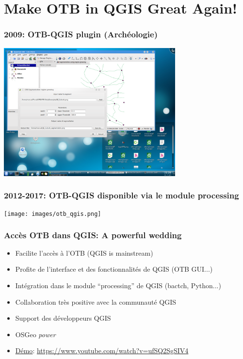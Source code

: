 \section{Make OTB in QGIS Great Again!}

\begin{frame}
\frametitle{2009: OTB-QGIS plugin (Archéologie)}
\begin{minipage}[t][6cm][t]{\textwidth}
\begin{center}
\includegraphics[width=0.7\textwidth]{images/otb-qgis-2009.png}
\end{center}
\end{minipage}
\end{frame}

\begin{frame}
\frametitle{2012-2017: OTB-QGIS disponible via le module processing}
\begin{minipage}[t][6cm][t]{\textwidth}
\begin{center}
\texttt{[image: images/otb\_qgis.png]}
\end{center}
\end{minipage}
\end{frame}

\begin{frame}
\frametitle{Accès OTB dans QGIS: A powerful wedding}
\begin{itemize}
\item Facilite l'accès à l'OTB (QGIS is mainstream)
\item Profite de l'interface et des fonctionnalités de QGIS (OTB GUI...)
\item Intégration dans le module ``processing'' de QGIS (bactch, Python...)
\item Collaboration très positive avec la communauté QGIS
\item Support des développeurs QGIS
\item OSGeo \textit{power}
\item \href{https://www.youtube.com/watch?v=ufSQ2SgSIV4}{Démo}: \url{https://www.youtube.com/watch?v=ufSQ2SgSIV4}
\end{itemize}
\end{frame}

